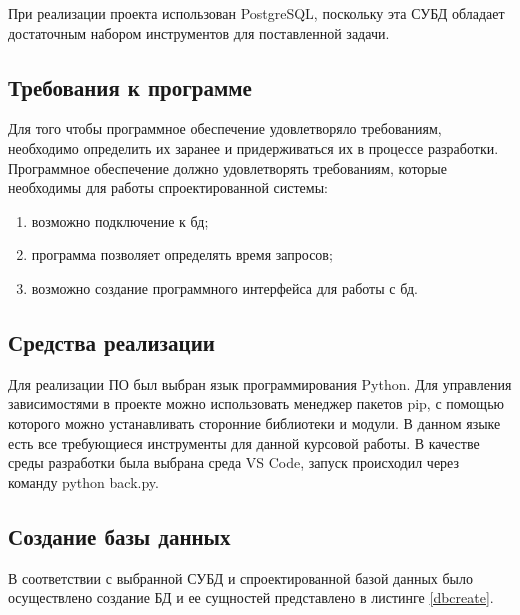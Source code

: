 При реализации проекта использован PostgreSQL,
поскольку эта СУБД обладает достаточным набором инструментов для поставленной
задачи.
\subsection{Требования к программе}

Для того чтобы программное обеспечение удовлетворяло требованиям, необходимо определить их заранее и придерживаться их в процессе разработки. Программное обеспечение должно удовлетворять требованиям, которые необходимы для работы спроектированной системы:
\begin{enumerate}[label=\arabic*.]
    \item возможно подключение к бд;
    \item программа позволяет определять время запросов;
    \item возможно создание программного интерфейса для работы с бд.
\end{enumerate}

\subsection{Средства реализации}

Для реализации ПО был выбран язык программирования Python\cite{python}. Для управления зависимостями в проекте можно использовать менеджер пакетов pip, с помощью которого можно устанавливать сторонние библиотеки и модули.
В данном языке есть все требующиеся инструменты для данной курсовой работы.
В качестве среды разработки была выбрана среда VS Code\cite{vscode}, запуск происходил через команду python back.py.

\subsection{Создание базы данных}

В соответствии с выбранной СУБД и спроектированной базой данных было
осуществлено создание БД и ее сущностей представлено в листинге \ref{dbcreate}.

